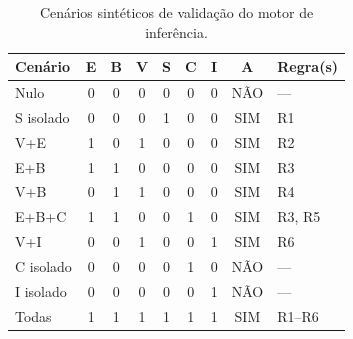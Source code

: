 
\begin{table}[H]
\centering
\caption{Cenários sintéticos de validação do motor de inferência.}
\label{tab:cenarios}
\begin{tabular}{lcccccccl}
\toprule
\textbf{Cenário} & \textbf{E} & \textbf{B} & \textbf{V} & \textbf{S} & \textbf{C} & \textbf{I} & \textbf{A} & \textbf{Regra(s)} \\
\midrule
Nulo             & 0 & 0 & 0 & 0 & 0 & 0 & NÃO & --- \\
S isolado        & 0 & 0 & 0 & 1 & 0 & 0 & SIM  & R1 \\
V+E              & 1 & 0 & 1 & 0 & 0 & 0 & SIM  & R2 \\
E+B              & 1 & 1 & 0 & 0 & 0 & 0 & SIM  & R3 \\
V+B              & 0 & 1 & 1 & 0 & 0 & 0 & SIM  & R4 \\
E+B+C            & 1 & 1 & 0 & 0 & 1 & 0 & SIM  & R3, R5 \\
V+I              & 0 & 0 & 1 & 0 & 0 & 1 & SIM  & R6 \\
C isolado        & 0 & 0 & 0 & 0 & 1 & 0 & NÃO & --- \\
I isolado        & 0 & 0 & 0 & 0 & 0 & 1 & NÃO & --- \\
Todas            & 1 & 1 & 1 & 1 & 1 & 1 & SIM  & R1--R6 \\
\bottomrule
\end{tabular}
\end{table}
